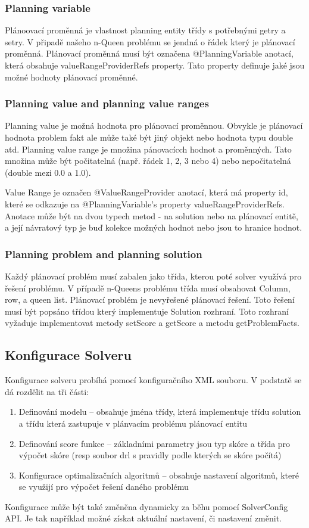 \subsubsection{Planning variable}
Plánoovací proměnná je vlastnost planning entity třídy s potřebnými getry a setry. V připadě našeho n-Queen problému se jendná o řádek který je plánovací proměnná. Plánovací proměnná musí být označena @PlanningVariable anotací, která obsahuje valueRangeProviderRefs property. Tato property definuje jaké jsou možné hodnoty plánovací proměnné. 

\subsubsection{Planning value and planning value ranges}
Planning value je možná hodnota pro plánovací proměnnou. Obvykle je plánovací hodnota problem fakt ale může také být jiný objekt nebo hodnota typu double atd. Planning value range je množina pánovacícch hodnot a proměnných. Tato množina může být počitatelná (např. řádek 1, 2, 3 nebo 4) nebo nepočitatelná (double mezi 0.0 a 1.0).

Value Range je označen @ValueRangeProvider anotací, která má property id, které se odkazuje na  @PlanningVariable's property valueRangeProviderRefs. Anotace může být na dvou typech metod - na solution nebo na plánovací entitě, a její návratový typ je buď kolekce možných hodnot nebo jsou to hranice hodnot.  

\subsubsection{Planning problem and planning solution}
Každý plánovací problém musí zabalen jako třída, kterou poté solver využívá pro řešení problému. V případě n-Queens problému třída musí obsahovat Column, row, a queen list.
Plánovací problém je nevyřešené plánovací řešení. Toto řešení musí být popsáno třídou který implementuje Solution rozhraní. Toto rozhraní vyžaduje implementovat metody setScore a getScore a metodu getProblemFacts. 

\subsection{Konfigurace Solveru}
Konfigurace solveru probíhá pomocí konfiguračního XML souboru. V podstatě se dá rozdělit na tři části:
\begin{enumerate}
\item Definování modelu -- obsahuje jména třídy, která implementuje třídu solution a třídu která zastupuje v plánvacím problému plánovací entitu
\item Definování score funkce -- základními parametry jsou typ skóre a třída pro výpočet skóre (resp soubor drl s pravidly podle kterých se skóre počítá)
\item Konfigurace optimalizačních algoritmů -- obsahuje nastavení algoritmů, které se využijí pro výpočet řešení daného problému
\end{enumerate}
Konfigurace může být také změněna dynamicky za běhu pomocí SolverConfig API. Je tak například možné získat aktuální nastavení, či nastavení změnit.


